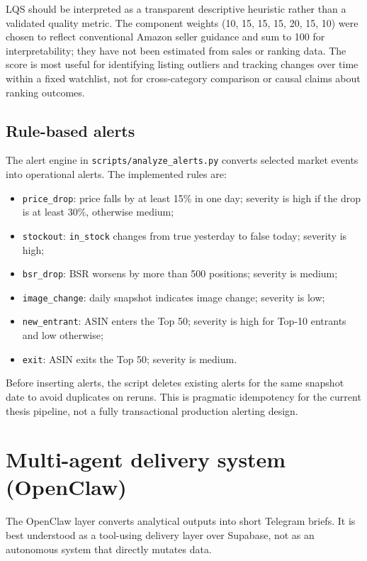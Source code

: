 LQS should be interpreted as a transparent descriptive heuristic rather than a validated quality metric. The component weights (10, 15, 15, 15, 20, 15, 10) were chosen to reflect conventional Amazon seller guidance and sum to 100 for interpretability; they have not been estimated from sales or ranking data. The score is most useful for identifying listing outliers and tracking changes over time within a fixed watchlist, not for cross-category comparison or causal claims about ranking outcomes.

\subsection{Rule-based alerts}

The alert engine in \texttt{scripts/analyze\_alerts.py} converts selected
market events into operational alerts. The implemented rules are:
\begin{itemize}
    \item \texttt{price\_drop}: price falls by at least 15\% in one day;
    severity is high if the drop is at least 30\%, otherwise medium;
    \item \texttt{stockout}: \texttt{in\_stock} changes from true
    yesterday to false today; severity is high;
    \item \texttt{bsr\_drop}: BSR worsens by more than 500 positions;
    severity is medium;
    \item \texttt{image\_change}: daily snapshot indicates image change;
    severity is low;
    \item \texttt{new\_entrant}: ASIN enters the Top 50; severity is high
    for Top-10 entrants and low otherwise;
    \item \texttt{exit}: ASIN exits the Top 50; severity is medium.
\end{itemize}
Before inserting alerts, the script deletes existing alerts for the same
snapshot date to avoid duplicates on reruns. This is pragmatic
idempotency for the current thesis pipeline, not a fully transactional
production alerting design.

\section{Multi-agent delivery system (OpenClaw)}

The OpenClaw layer converts analytical outputs into short Telegram
briefs. It is best understood as a tool-using delivery layer over
Supabase, not as an autonomous system that directly mutates data.

